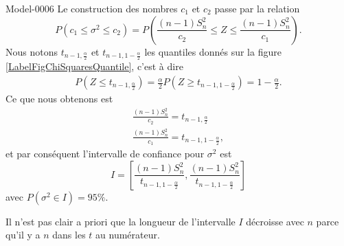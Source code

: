 \begin{corrige}{Model-0006}
    Le construction des nombres \( c_1\) et \( c_2\) passe par la relation
    \begin{equation}
        P(c_1\leq \sigma^2\leq c_2)=P\left( \frac{ (n-1)S_n^2 }{ c_2 }\leq Z\leq\frac{ (n-1)S_n^2 }{ c_1 } \right).
    \end{equation}
    Nous notons \( t_{n-1,\frac{ \alpha }{2}}\) et \( t_{n-1,1-\frac{ \alpha }{2}}\) les quantiles donnés sur la figure \ref{LabelFigChiSquaresQuantile}, c'est à dire
    \begin{subequations}
        \begin{align}
            P(Z\leq t_{n-1,\frac{ \alpha }{2}})=\frac{ \alpha }{2}
            P(Z\geq t_{n-1,1-\frac{ \alpha }{2}})=1-\frac{ \alpha }{2}.
        \end{align}
    \end{subequations}
    Ce que nous obtenons est
    \begin{subequations}
        \begin{align}
            \frac{ (n-1)S_n^2 }{ c_2 }=t_{n-1,\frac{ \alpha }{2}}\\
            \frac{ (n-1)S_n^2 }{ c_1 }=t_{n-1,1-\frac{ \alpha }{2}},
        \end{align}
    \end{subequations}
    et par conséquent l'intervalle de confiance pour \( \sigma^2\) est
    \begin{equation}
        I=\left[ \frac{ (n-1)S_n^2 }{ t_{n-1,1-\frac{ \alpha }{2}} },\frac{ (n-1)S_n^2 }{ t_{n-1,1-\frac{ \alpha }{2}} } \right]
    \end{equation}
    avec \( P(\sigma^2\in I)=95\%\).
    
    \begin{remark}
        Il n'est pas clair a priori que la longueur de l'intervalle \( I\) décroisse avec \( n\) parce qu'il y a \( n\) dans les \( t\) au numérateur.
    \end{remark}

\end{corrige}
